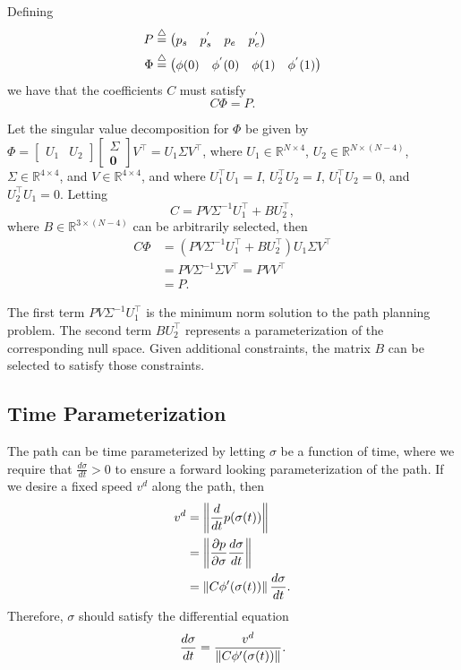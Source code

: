 Defining 
\begin{align*}
P &\stackrel{\triangle}{=} \begin{pmatrix} p_s & p_s^{'} & p_e & p_e^{'} \end{pmatrix} \\
\Phi &\stackrel{\triangle}{=} \begin{pmatrix} \phi(0) & \phi^{'}(0) & \phi(1) & \phi^{'}(1) \end{pmatrix}
\end{align*}
we have that the coefficients $C$ must satisfy
\begin{equation}\label{eq:flat-coefficient-equation}
C\Phi = P.  
\end{equation}

Let the singular value decomposition for $\Phi$ be given by $\Phi = \begin{bmatrix}U_1 & U_2\end{bmatrix}\begin{bmatrix}\Sigma \\ \mathbf{0} \end{bmatrix}V^\top = U_1\Sigma V^\top$, where 
$U_1\in\mathbb{R}^{N\times 4}$, $U_2\in\mathbb{R}^{N\times (N-4)}$, $\Sigma\in\mathbb{R}^{4\times 4}$, and $V\in\mathbb{R}^{4\times 4}$, and where $U_1^\top U_1 = I$, $U_2^\top U_2=I$, $U_1^\top U_2 = 0$, and $U_2^\top U_1=0$.  Letting
\[
C = PV\Sigma^{-1}U_1^\top + BU_2^\top,
\]
where $B\in\mathbb{R}^{3\times (N-4)}$ can be arbitrarily selected, then 
\begin{align*}
C\Phi &= (PV\Sigma^{-1}U_1^\top + BU_2^\top)U_1\Sigma V^\top \\
      &= PV\Sigma^{-1}\Sigma V^\top = P V V^\top \\
      &= P.
\end{align*}

The first term $PV\Sigma^{-1}U_1^\top$ is the minimum norm solution to the path planning problem.  The second term $BU_2^\top$ represents a parameterization of the corresponding null space.  Given additional constraints, the matrix $B$ can be selected to satisfy those constraints.


\subsection{Time Parameterization}
The path can be time parameterized by letting $\sigma$ be a function of time, where we require that $\frac{d\sigma}{dt}>0$ to ensure a forward looking parameterization of the path.  If we desire a fixed speed $v^d$ along the path, then 
\begin{align*}
v^d &= \left\|\frac{d}{dt}p(\sigma(t))\right\| \\
&= \left\|\frac{\partial p}{\partial\sigma}\frac{d\sigma}{dt}\right\| \\
&= \left\|C\phi'(\sigma(t))\right\|\frac{d\sigma}{dt}.
\end{align*}
Therefore, $\sigma$ should satisfy the differential equation
\[
\frac{d\sigma}{dt} = \frac{v^d}{\left\|C\phi'(\sigma(t))\right\|}.
\]


